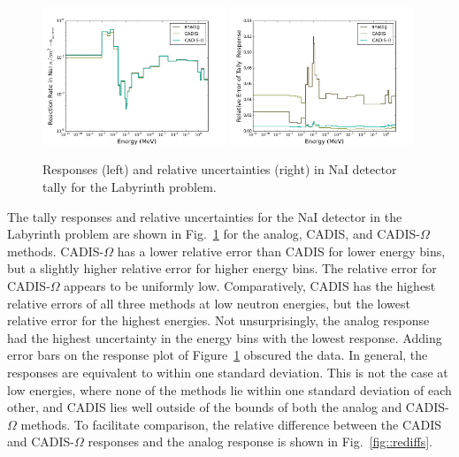 \documentclass[12pt]{article}
\begin{document}
\begin{figure}
  \begin{center}
    \includegraphics[width=0.49\textwidth]{./images/maze2_response_p3q10.png}
    \includegraphics[width=0.49\textwidth]{./images/maze2_RE_p3q10.png}
    \caption[]{\label{fig::tallyresponse} Responses (left) and relative uncertainties (right) in NaI detector tally for the Labyrinth problem. }
  \end{center}
\end{figure}

The tally responses and relative uncertainties for the NaI detector in the Labyrinth problem are shown in Fig.~\ref{fig::tallyresponse} for the analog, CADIS, and CADIS-$\Omega$ methods.  CADIS-$\Omega$ has a lower relative error than CADIS for lower energy bins, but a slightly higher relative error for higher energy bins. The relative error for CADIS-$\Omega$ appears to be uniformly low. Comparatively, CADIS has the highest relative errors of all three methods at low neutron energies, but the lowest relative error for the highest energies. Not unsurprisingly, the analog response had the highest uncertainty in the energy bins with the lowest response. Adding error bars on the response plot of Figure~\ref{fig::tallyresponse} obscured the data. In general, the responses are equivalent to within one standard deviation. This is not the case at low energies, where none of the methods lie within one standard deviation of each other, and CADIS lies well outside of the bounds of both the analog and CADIS-$\Omega$ methods. 
To facilitate comparison, the relative difference between the CADIS and CADIS-$\Omega$ responses and the analog response is shown in Fig.~\ref{fig::rediffs}. 
\end{document}
